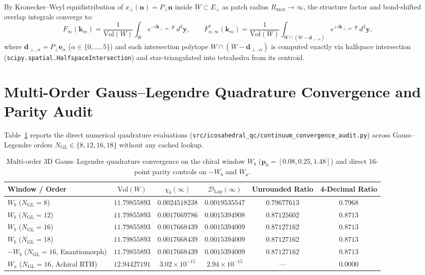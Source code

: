 \documentclass[11pt,a4paper]{article}
\begin{document}
By Kronecker--Weyl equidistribution of $x_\perp(\mathbf{n}) = P_\perp \mathbf{n}$ inside $W \subset E_\perp$ as patch radius $R_{\max} \to \infty$, the structure factor and bond-shifted overlap integrals converge to:
\begin{equation}
F_\infty(\mathbf{k}_m) = \frac{1}{\mathrm{Vol}(W)} \int_W e^{-i \mathbf{k}_{\perp,m}\cdot \mathbf{y}} \, d^3\mathbf{y}, \qquad
F_{\alpha,\infty}^*(\mathbf{k}_m) = \frac{1}{\mathrm{Vol}(W)} \int_{W \cap (W - \mathbf{d}_{\perp,\alpha})} e^{+i \mathbf{k}_{\perp,m}\cdot \mathbf{y}} \, d^3\mathbf{y},
\end{equation}
where $\mathbf{d}_{\perp,\alpha} = P_\perp \mathbf{e}_\alpha$ ($\alpha \in \{0,\dots,5\}$) and each intersection polytope $W \cap (W - \mathbf{d}_{\perp,\alpha})$ is computed exactly via halfspace intersection (\texttt{scipy.spatial.HalfspaceIntersection}) and star-triangulated into tetrahedra from its centroid.

\section{Multi-Order Gauss--Legendre Quadrature Convergence and Parity Audit}

Table~\ref{tab:gl_convergence} reports the direct numerical quadrature evaluations (\texttt{src/icosahedral\_qc/continuum\_convergence\_audit.py}) across Gauss--Legendre orders $N_{\mathrm{GL}} \in \{8, 12, 16, 18\}$ without any cached lookup.

\begin{table}[htbp]
\centering
\caption{Multi-order 3D Gauss--Legendre quadrature convergence on the chiral window $W_b$ ($\mathbf{p}_0 = [0.08, 0.25, 1.48]$) and direct 16-point parity controls on $-W_b$ and $W_a$.}
\label{tab:gl_convergence}
\begin{tabular}{@{}lccccc@{}}
\toprule
\textbf{Window / Order} & $\mathrm{Vol}(W)$ & $\chi_b(\infty)$ & $\mathcal{D}_{\mathrm{Lap}}(\infty)$ & \textbf{Unrounded Ratio} & \textbf{4-Decimal Ratio} \\
\midrule
$W_b$ ($N_{\mathrm{GL}} = 8$)  & $11.79855893$ & $0.0024518238$ & $0.0019535547$ & $0.79677613$ & $0.7968$ \\
$W_b$ ($N_{\mathrm{GL}} = 12$) & $11.79855893$ & $0.0017669786$ & $0.0015394908$ & $0.87125602$ & $\mathbf{0.8713}$ \\
$W_b$ ($N_{\mathrm{GL}} = 16$) & $11.79855893$ & $0.0017668439$ & $0.0015394009$ & $0.87127162$ & $\mathbf{0.8713}$ \\
$W_b$ ($N_{\mathrm{GL}} = 18$) & $11.79855893$ & $0.0017668439$ & $0.0015394009$ & $0.87127162$ & $\mathbf{0.8713}$ \\
\midrule
$-W_b$ ($N_{\mathrm{GL}} = 16$, Enantiomorph) & $11.79855893$ & $0.0017668439$ & $0.0015394009$ & $0.87127162$ & $\mathbf{0.8713}$ \\
$W_a$ ($N_{\mathrm{GL}} = 16$, Achiral RTH) & $12.94427191$ & $3.02\times 10^{-15}$ & $2.94\times 10^{-15}$ & --- & $0.0000$ \\
\bottomrule
\end{tabular}
\end{table}
\end{document}
